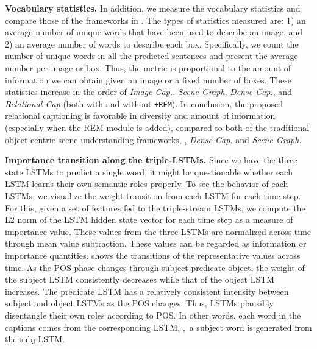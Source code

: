 \noindent\textbf{Vocabulary statistics.}
In addition, we measure the vocabulary statistics and compare those of
the frameworks in .
The types of statistics measured are:
1) an average number of unique words that have been used to describe an image, and
2) an average number of words to describe each box.
Specifically, we count the number of unique words in all the predicted sentences and present the average number per image or box.
Thus, the metric {is proportional to} the amount of information we can obtain given an image or a fixed number of boxes.
These statistics increase in the order of \emph{Image Cap.}, \emph{Scene Graph}, \emph{Dense Cap.}, and \emph{Relational Cap} ({both with and without \texttt{+REM}}).
{In conclusion, the proposed relational captioning is favorable
in diversity and amount of information ({especially when {the} REM module is added}), compared to both of the traditional object-centric scene understanding frameworks, \ie, \emph{Dense Cap.} and \emph{Scene Graph}.}









\noindent\textbf{Importance transition along the triple-LSTMs.}
{Since we have the three state LSTMs to predict a single word, it might be questionable whether each LSTM learns their own semantic roles properly.
To see the behavior of each LSTMs,}
we visualize the weight transition from each LSTM for each time step. 
For this, given a set of features fed to the triple-stream LSTMs, we compute the L2 norm of the LSTM hidden state vector for each time step {as a measure of importance value}. 
These {values} from the three LSTMs are normalized across time through mean value subtraction.
These {values} can be regarded as information or importance quantities.
 shows the transitions of the representative values across time. 
As the {POS phase} changes through subject-predicate-object, the weight of the subject LSTM consistently decreases {while that of the object LSTM increases.}
{The} predicate LSTM has {a relatively consistent} intensity between subject and object LSTMs {as the POS changes}.
Thus, LSTMs plausibly disentangle their own roles according to POS.
{In other words, each word in the captions comes from the corresponding LSTM, \eg,~a subject word is generated from the subj-LSTM.}








